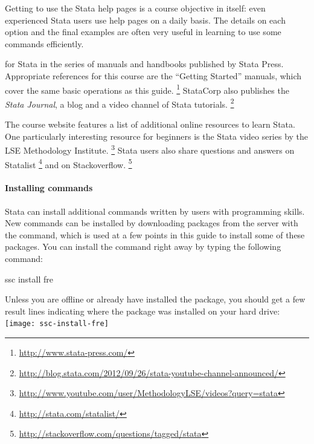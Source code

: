     Getting to use the Stata help pages is a course objective in itself: even experienced Stata users use help pages on a daily basis. The details on each option and the final examples are often very useful in learning to use some commands efficiently.%

     for Stata in the series of manuals and handbooks published by Stata Press. Appropriate references for this course are the ``Getting Started'' manuals, which cover the same basic operations as this guide.%
      \footnote{\url{http://www.stata-press.com/}} %
      StataCorp also publishes the \emph{Stata Journal}, a blog and a video channel of Stata tutorials.%
      \footnote{\url{http://blog.stata.com/2012/09/26/stata-youtube-channel-announced/}}
  
    The course website features a list of additional online resources to learn Stata. One particularly interesting resource for beginners is the Stata video series by the LSE Methodology Institute.%
      \footnote{\url{http://www.youtube.com/user/MethodologyLSE/videos?query=stata}} %
      Stata users also share questions and answers on Statalist%
      \footnote{\url{http://stata.com/statalist/}} %
      and on Stackoverflow.%
      \footnote{\url{http://stackoverflow.com/questions/tagged/stata}}

%
%
\paragraph{Installing commands}%

Stata can install additional commands written by users with programming skills. New commands can be installed by downloading packages from the \SSC server with the  command, which is used at a few points in this guide to install some of these packages. You can install the  command right away by typing the following command:%
  
\begin{docspec}
  ssc install fre
\end{docspec}
  
Unless you are offline or already have installed the  package, you should get a few result lines indicating where the package was installed on your hard drive:\\[1em]%
  
\texttt{[image: ssc-install-fre]}\\[1em]
  
